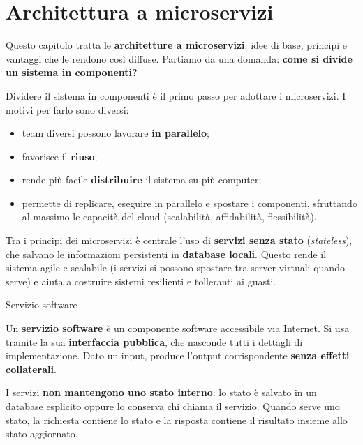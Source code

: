 \chapter{Architettura a microservizi}\label{ch-06}


Questo capitolo tratta le \textbf{architetture a microservizi}: idee di
base, principi e vantaggi che le rendono così diffuse. Partiamo da una
domanda: \textbf{come si divide un sistema in componenti?}

Dividere il sistema in componenti è il primo passo per adottare i
microservizi. I motivi per farlo sono diversi:

\begin{itemize}
\tightlist
\item
  team diversi possono lavorare \textbf{in parallelo};
\item
  favorisce il \textbf{riuso};
\item
  rende più facile \textbf{distribuire} il sistema su più computer;
\item
  permette di replicare, eseguire in parallelo e spostare i componenti,
  sfruttando al massimo le capacità del cloud (scalabilità,
  affidabilità, flessibilità).
\end{itemize}

Tra i principi dei microservizi è centrale l'uso di \textbf{servizi
senza stato} (\emph{stateless}), che salvano le informazioni persistenti
in \textbf{database locali}. Questo rende il sistema agile e scalabile
(i servizi si possono spostare tra server virtuali quando serve) e aiuta
a costruire sistemi resilienti e tolleranti ai guasti.

\begin{boxdefinition}{Servizio software}

Un \textbf{servizio software} è un componente software accessibile via
Internet. Si usa tramite la sua \textbf{interfaccia pubblica}, che
nasconde tutti i dettagli di implementazione. Dato un input, produce
l'output corrispondente \textbf{senza effetti collaterali}.

\end{boxdefinition}

I servizi \textbf{non mantengono uno stato interno}: lo stato è salvato
in un database esplicito oppure lo conserva chi chiama il servizio.
Quando serve uno stato, la richiesta contiene lo stato e la risposta
contiene il risultato insieme allo stato aggiornato.

